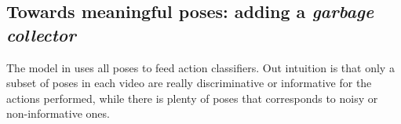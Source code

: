 \subsection{Towards meaningful poses: adding a \emph{garbage collector}} 
 
The model in \cite{Lillo2014} uses all poses to feed action classifiers. Out intuition is that only a subset of poses in each video are really discriminative or informative for the actions performed, while there is plenty of poses that corresponds to noisy or non-informative ones.

%
%

